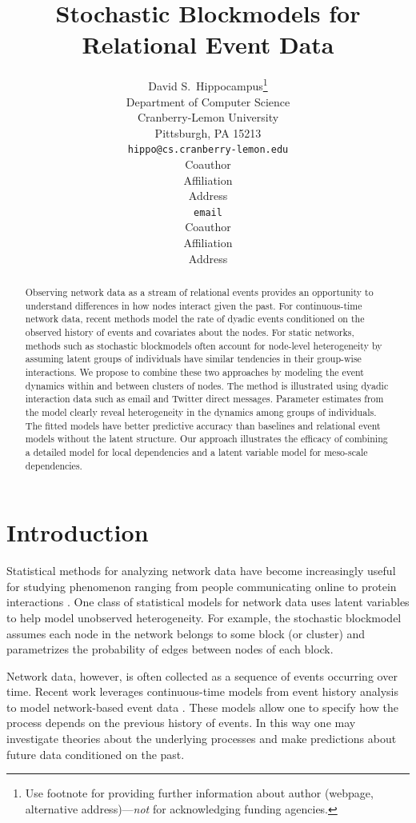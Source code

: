 \documentclass{article}
\title{Stochastic Blockmodels for Relational Event Data}
\author{
David S.~Hippocampus\thanks{ Use footnote for providing further information
about author (webpage, alternative address)---\emph{not} for acknowledging
funding agencies.} \\
Department of Computer Science\\
Cranberry-Lemon University\\
Pittsburgh, PA 15213 \\
\texttt{hippo@cs.cranberry-lemon.edu} \\
\And
Coauthor \\
Affiliation \\
Address \\
\texttt{email} \\
\AND
Coauthor \\
Affiliation \\
Address \\
}
\begin{document}
 

\maketitle

\begin{abstract}
Observing network data as a stream of relational events provides an opportunity to understand differences in how nodes interact given the past.  For continuous-time network data, recent methods model the rate of dyadic events conditioned on the observed history of events and covariates about the nodes.  For static networks, methods such as stochastic blockmodels often account for node-level heterogeneity by assuming latent groups of individuals have similar tendencies in their group-wise interactions.  We propose to combine these two approaches by modeling the event dynamics within and between clusters of nodes.  The method is illustrated using dyadic interaction data such as email and Twitter direct messages.  Parameter estimates from the model clearly reveal heterogeneity in the dynamics among groups of individuals.  The fitted models have better predictive accuracy than baselines and relational event models without the latent structure.  Our approach illustrates the efficacy of combining a detailed model for local dependencies and a latent variable model for meso-scale dependencies.
\end{abstract}

\section{Introduction}

Statistical methods for analyzing network data have become increasingly useful for studying  phenomenon ranging from people communicating online to protein interactions \cite{Goldenberg2009}.  One class of statistical models for network data uses latent variables to help model unobserved heterogeneity.  For example, the stochastic blockmodel \cite{Nowicki2001, Kemp, Ishiguro2010} assumes each node in the network belongs to some block (or cluster) and parametrizes the probability of edges between nodes of each block.  %

Network data, however, is often collected as a sequence of events occurring over time.   Recent work leverages  continuous-time models from event history analysis  \cite{AalenOddO.2008} to model network-based event data \cite{Butts2008,Brandes2009,Perry2011,Stadtfeld2010,Stadtfeld2011,Opsahl2011,Vu2011,Vu2011a}.  These models allow one to specify how the process depends on the previous history of events.  In this way one may investigate theories about the underlying processes and make predictions about future data conditioned on the past.
\end{document}
